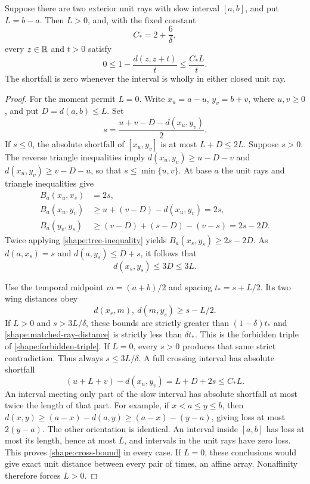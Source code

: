 \begin{lemma}\label{shape:crossloss}
Suppose there are two exterior unit rays with slow interval $[a,b]$,
and put $L=b-a$.  Then $L>0$, and, with the fixed constant
\begin{equation}\label{shape:cross-constant}
 C_*=2+\frac6\delta,
\end{equation}
every $z\in\mathbb{R}$ and $t>0$ satisfy
\begin{equation}\label{shape:cross-bound}
 0\le 1-\frac{d(z,z+t)}t\le\frac{C_*L}{t}.
\end{equation}
The shortfall is zero whenever the interval is wholly in either closed
unit ray.
\end{lemma}

\begin{proof}
For the moment permit $L=0$.  Write
$x_u=a-u$, $y_v=b+v$, where $u,v\ge0$, and put $D=d(a,b)\le L$.
Set
\[
 s=\frac{u+v-D-d(x_u,y_v)}2.
\]
If $s\le0$, the absolute shortfall of $[x_u,y_v]$ is at most
$L+D\le2L$.  Suppose $s>0$.  The reverse triangle inequalities imply
$d(x_u,y_v)\ge u-D-v$ and $d(x_u,y_v)\ge v-D-u$, so that
$s\le\min\{u,v\}$.  At base $a$ the unit rays and triangle inequalities
give
\begin{align*}
 B_a(x_u,x_s)&=2s,\\
 B_a(x_u,y_v)&\ge u+(v-D)-d(x_u,y_v)=2s,\\
 B_a(y_v,y_s)&\ge(v-D)+(s-D)-(v-s)=2s-2D.
\end{align*}
Twice applying \cref{shape:tree-inequality} yields
$B_a(x_s,y_s)\ge2s-2D$.  As $d(a,x_s)=s$ and
$d(a,y_s)\le D+s$, it follows that
\begin{equation}\label{shape:matched-ray-distance}
 d(x_s,y_s)\le3D\le3L.
\end{equation}

Use the temporal midpoint $m=(a+b)/2$ and spacing $t_*=s+L/2$.
Its two wing distances obey
\[
 d(x_s,m),\ d(m,y_s)\ge s-L/2.
\]
If $L>0$ and $s>3L/\delta$, these bounds are strictly greater than
$(1-\delta)t_*$ and \cref{shape:matched-ray-distance} is strictly less
than $\delta t_*$.  This is the forbidden triple of
\cref{shape:forbidden-triple}.  If $L=0$, every $s>0$ produces that same
strict contradiction.  Thus always $s\le3L/\delta$.  A full crossing
interval has absolute shortfall
\[
 (u+L+v)-d(x_u,y_v)=L+D+2s\le C_*L.
\]
An interval meeting only part of the slow interval has absolute
shortfall at most twice the length of that part.  For example, if
$x<a\le y\le b$, then
$d(x,y)\ge(a-x)-d(a,y)\ge(a-x)-(y-a)$, giving loss at most $2(y-a)$.
The other orientation is identical.  An interval inside $[a,b]$ has loss
at most its length, hence at most $L$, and intervals in the unit rays
have zero loss.  This proves \cref{shape:cross-bound} in every case.
If $L=0$, these conclusions would give exact unit distance between every
pair of times, an affine array.  Nonaffinity therefore forces $L>0$.
\end{proof}

